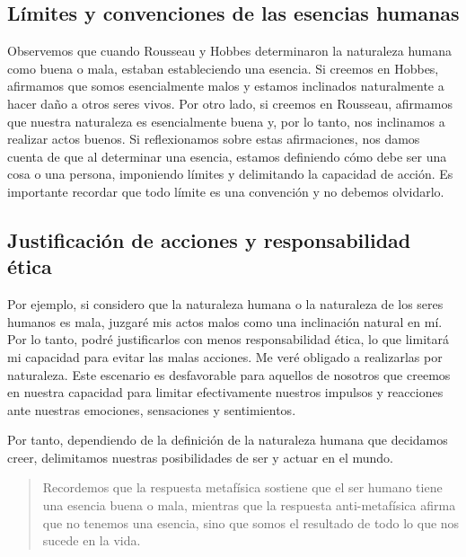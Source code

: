 \documentclass[
  letterpaper,
  DIV=11,
  numbers=noendperiod]{scrartcl}
\begin{document}
\hypertarget{luxedmites-y-convenciones-de-las-esencias-humanas}{%
\subsection{Límites y convenciones de las esencias
humanas}\label{luxedmites-y-convenciones-de-las-esencias-humanas}}

Observemos que cuando Rousseau y Hobbes determinaron la naturaleza
humana como buena o mala, estaban estableciendo una esencia. Si creemos
en Hobbes, afirmamos que somos esencialmente malos y estamos inclinados
naturalmente a hacer daño a otros seres vivos. Por otro lado, si creemos
en Rousseau, afirmamos que nuestra naturaleza es esencialmente buena y,
por lo tanto, nos inclinamos a realizar actos buenos. Si reflexionamos
sobre estas afirmaciones, nos damos cuenta de que al determinar una
esencia, estamos definiendo cómo debe ser una cosa o una persona,
imponiendo límites y delimitando la capacidad de acción. Es importante
recordar que todo límite es una convención y no debemos olvidarlo.

\hypertarget{justificaciuxf3n-de-acciones-y-responsabilidad-uxe9tica}{%
\subsection{Justificación de acciones y responsabilidad
ética}\label{justificaciuxf3n-de-acciones-y-responsabilidad-uxe9tica}}

Por ejemplo, si considero que la naturaleza humana o la naturaleza de
los seres humanos es mala, juzgaré mis actos malos como una inclinación
natural en mí. Por lo tanto, podré justificarlos con menos
responsabilidad ética, lo que limitará mi capacidad para evitar las
malas acciones. Me veré obligado a realizarlas por naturaleza. Este
escenario es desfavorable para aquellos de nosotros que creemos en
nuestra capacidad para limitar efectivamente nuestros impulsos y
reacciones ante nuestras emociones, sensaciones y sentimientos.

Por tanto, dependiendo de la definición de la naturaleza humana que
decidamos creer, delimitamos nuestras posibilidades de ser y actuar en
el mundo.

\begin{quote}
Recordemos que la respuesta metafísica sostiene que el ser humano tiene
una esencia buena o mala, mientras que la respuesta anti-metafísica
afirma que no tenemos una esencia, sino que somos el resultado de todo
lo que nos sucede en la vida.
\end{quote}
\end{document}
